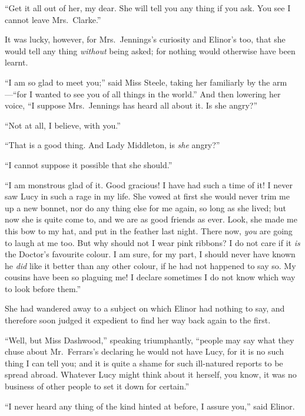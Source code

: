 \documentclass{article}
\begin{document}
``Get it all out of her, my dear.  She will tell you
any thing if you ask.  You see I cannot leave Mrs.\ Clarke.''

It was lucky, however, for Mrs.\ Jennings's curiosity
and Elinor's too, that she would tell any thing \emph{without}
being asked; for nothing would otherwise have been learnt.

``I am so glad to meet you;'' said Miss Steele,
taking her familiarly by the arm---``for I wanted to see you
of all things in the world.''  And then lowering her voice,
``I suppose Mrs.\ Jennings has heard all about it.
Is she angry?''

``Not at all, I believe, with you.''

``That is a good thing.  And Lady Middleton, is \emph{she} angry?''

``I cannot suppose it possible that she should.''

``I am monstrous glad of it.  Good gracious!  I have
had such a time of it!  I never saw Lucy in such a rage
in my life.  She vowed at first she would never trim me
up a new bonnet, nor do any thing else for me again,
so long as she lived; but now she is quite come to,
and we are as good friends as ever.  Look, she made me
this bow to my hat, and put in the feather last night.
There now, \emph{you} are going to laugh at me too.  But why
should not I wear pink ribbons?  I do not care if it \emph{is}
the Doctor's favourite colour.  I am sure, for my part,
I should never have known he \emph{did} like it better than
any other colour, if he had not happened to say so.
My cousins have been so plaguing me!  I declare sometimes
I do not know which way to look before them.''

She had wandered away to a subject on which Elinor
had nothing to say, and therefore soon judged it expedient
to find her way back again to the first.

``Well, but Miss Dashwood,'' speaking triumphantly,
``people may say what they chuse about Mr.\ Ferrars's
declaring he would not have Lucy, for it is no such thing
I can tell you; and it is quite a shame for such ill-natured
reports to be spread abroad.  Whatever Lucy might think
about it herself, you know, it was no business of other
people to set it down for certain.''

``I never heard any thing of the kind hinted at before,
I assure you,'' said Elinor.
\end{document}
